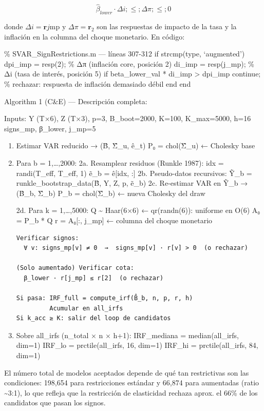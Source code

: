 \documentclass[
]{article}
\begin{document}
\[\hat{\beta}_{lower}\cdot\Delta i ;\leq; \Delta\pi ;\leq; 0\]

donde \(\Delta i = \mathbf{r}{j\text{mp}}\) y
\(\Delta\pi = \mathbf{r}_2\) son las respuestas de impacto de la tasa y
la inflación en la columna del choque monetario. En código:

\% SVAR\_SignRestrictions.m --- líneas 307-312 if strcmp(type,
`augmented') dpi\_imp = resp(2); \% Δπ (inflación core, posición 2)
di\_imp = resp(j\_mp); \% Δi (tasa de interés, posición 5) if
beta\_lower\_val * di\_imp \textgreater{} dpi\_imp continue; \%
rechazar: respuesta de inflación demasiado débil end end

Algorithm 1 (C\&E) --- Descripción completa:

Inputs: Y (T×6), Z (T×3), p=3, B\_boot=2000, K=100, K\_max=5000, h=16
signs\_mp, β\_lower, j\_mp=5

\begin{enumerate}
\def\labelenumi{\arabic{enumi}.}
\item
  Estimar VAR reducido → (B̂, Σ̂\_u, ê\_t) P₀ = chol(Σ̂\_u) ← Cholesky base
\item
  Para b = 1,\ldots,2000: 2a. Resamplear residuos (Runkle 1987): idx =
  randi(T\_eff, T\_eff, 1) ẽ\_b = ê{[}idx, :{]} 2b. Pseudo-datos
  recursivos: Ỹ\_b = runkle\_bootstrap\_data(B̂, Y, Z, p, ẽ\_b) 2c.
  Re-estimar VAR en Ỹ\_b → (B̂\_b, Σ̂\_b) P\_b = chol(Σ̂\_b) ← nueva
  Cholesky del draw

  2d. Para k = 1,\ldots,5000: Q \textasciitilde{} Haar(6×6) ←
  qr(randn(6)): uniforme en O(6) A₀ = P\_b * Q r = A₀{[}:, j\_mp{]} ←
  columna del choque monetario

\begin{verbatim}
Verificar signos:
  ∀ v: signs_mp[v] ≠ 0  →  signs_mp[v] · r[v] > 0  (o rechazar)

(Solo aumentado) Verificar cota:
  β_lower · r[j_mp] ≤ r[2]  (o rechazar)

Si pasa: IRF_full = compute_irf(B̂_b, n, p, r, h)
         Acumular en all_irfs
Si k_acc ≥ K: salir del loop de candidatos
\end{verbatim}
\item
  Sobre all\_irfs (n\_total × n × h+1): IRF\_mediana = median(all\_irfs,
  dim=1) IRF\_lo = prctile(all\_irfs, 16, dim=1) IRF\_hi =
  prctile(all\_irfs, 84, dim=1)
\end{enumerate}

El número total de modelos aceptados depende de qué tan restrictivas son
las condiciones: 198,654 para restricciones estándar y 66,874 para
aumentadas (ratio\\
\textasciitilde3:1), lo que refleja que la restricción de elasticidad
rechaza aprox. el 66\% de los candidatos que pasan los signos.
\end{document}

